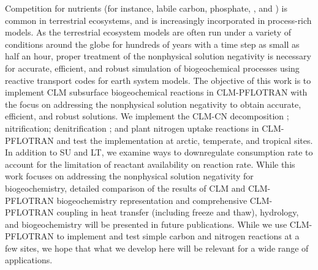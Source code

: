 \documentclass[gmd, manuscript]{copernicus}
\begin{document}
Competition for  nutrients (for instance, labile carbon, phosphate, ,
and ) is common in terrestrial ecosystems, and is increasingly
incorporated in process-rich models. As the terrestrial ecosystem models are
often run under a variety of conditions around the globe for hundreds of years
with a time step as small as half an hour, proper treatment of the
nonphysical solution negativity is necessary for accurate, efficient, and robust simulation
of biogeochemical processes using reactive transport codes for earth system
models. The objective of this work is to implement CLM subsurface
biogeochemical reactions in CLM-PFLOTRAN with the focus on addressing the
nonphysical solution negativity to obtain accurate, efficient, and robust solutions. We
implement the CLM-CN decomposition \citep{Bonan2012,Oleson2013,Thornton2005};
nitrification; denitrification \citep{Dickinson2002,Parton2001,Parton1996}; and
plant nitrogen uptake reactions in CLM-PFLOTRAN and test the implementation at
arctic, temperate, and tropical sites. In addition to SU and LT, %
we examine ways to downregulate consumption rate to account
for the limitation of reactant availability on reaction rate. While this work
focuses on addressing the nonphysical solution negativity for biogeochemistry, detailed
comparison of the results of CLM and CLM-PFLOTRAN biogeochemistry
representation and comprehensive CLM-PFLOTRAN coupling in heat transfer
(including freeze and thaw), hydrology,  and biogeochemistry will be presented
in future publications.  While we use CLM-PFLOTRAN to implement and test simple
carbon and nitrogen reactions at a few sites, we hope that what we develop here
will be relevant for a wide range of applications.





%

\end{document}
